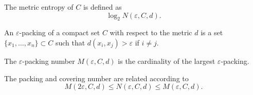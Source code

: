 \begin{boxdefinition}
    The metric entropy of $C$ is defined 
    as 
    $$
    \log_2 N(\varepsilon,C,d)
    .$$
\end{boxdefinition}

\begin{boxdefinition}
    An $\varepsilon$-packing of a compact set $C$
    with respect to the metric $d$ is a set 
    $\{x_1,\dots,x_n\}\subset C$ such that 
    $d(x_i,x_j)>\varepsilon$ if $i\neq j$.
\end{boxdefinition}

\begin{boxdefinition}
    The $\varepsilon$-packing number 
    $M(\varepsilon,C,d)$ is the cardinality of 
    the largest $\varepsilon$-packing.
\end{boxdefinition}

\begin{boxtheorem}[]
    The packing and covering number are related 
    according to 
    $$
    M(2\varepsilon,C,d)\leq N(\varepsilon, C,d)\leq
    M(\varepsilon,C,d)
    .$$
\end{boxtheorem}